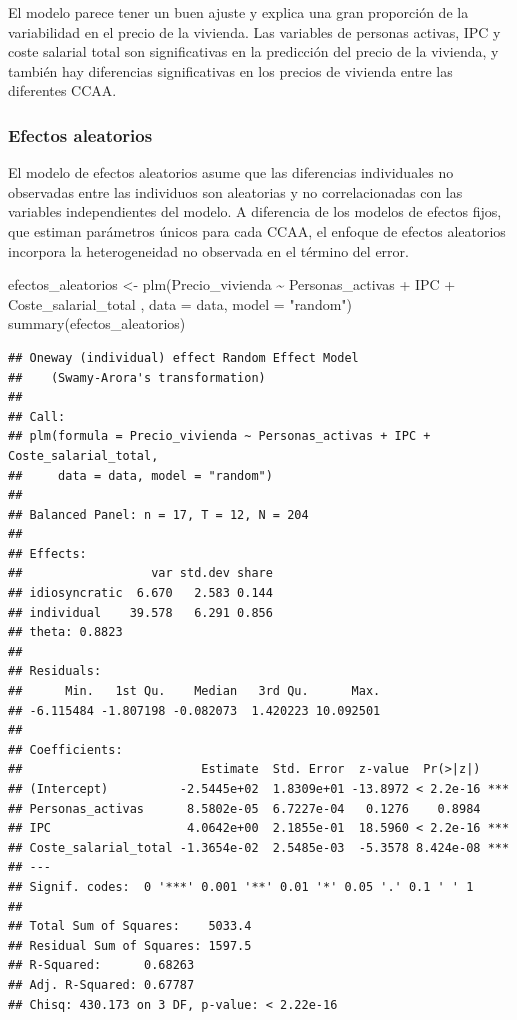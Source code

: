 \documentclass[
]{article}
\newenvironment{Shaded}{\begin{snugshade}}{\end{snugshade}}
\newcommand{\AttributeTok}[1]{\textcolor[rgb]{0.77,0.63,0.00}{#1}}
\newcommand{\FunctionTok}[1]{\textcolor[rgb]{0.00,0.00,0.00}{#1}}
\newcommand{\NormalTok}[1]{#1}
\newcommand{\OtherTok}[1]{\textcolor[rgb]{0.56,0.35,0.01}{#1}}
\newcommand{\SpecialCharTok}[1]{\textcolor[rgb]{0.00,0.00,0.00}{#1}}
\newcommand{\StringTok}[1]{\textcolor[rgb]{0.31,0.60,0.02}{#1}}
\begin{document}
El modelo parece tener un buen ajuste y explica una gran proporción de
la variabilidad en el precio de la vivienda. Las variables de personas
activas, IPC y coste salarial total son significativas en la predicción
del precio de la vivienda, y también hay diferencias significativas en
los precios de vivienda entre las diferentes CCAA.

\hypertarget{efectos-aleatorios}{%
\subsubsection{Efectos aleatorios}\label{efectos-aleatorios}}

El modelo de efectos aleatorios asume que las diferencias individuales
no observadas entre las individuos son aleatorias y no correlacionadas
con las variables independientes del modelo. A diferencia de los modelos
de efectos fijos, que estiman parámetros únicos para cada CCAA, el
enfoque de efectos aleatorios incorpora la heterogeneidad no observada
en el término del error.

\begin{Shaded}
\begin{Highlighting}[]
\NormalTok{efectos\_aleatorios }\OtherTok{\textless{}{-}} \FunctionTok{plm}\NormalTok{(Precio\_vivienda }\SpecialCharTok{\textasciitilde{}}\NormalTok{ Personas\_activas }\SpecialCharTok{+}\NormalTok{ IPC }\SpecialCharTok{+}\NormalTok{ Coste\_salarial\_total , }\AttributeTok{data =}\NormalTok{ data, }\AttributeTok{model =} \StringTok{"random"}\NormalTok{)}
\FunctionTok{summary}\NormalTok{(efectos\_aleatorios)}
\end{Highlighting}
\end{Shaded}

\begin{verbatim}
## Oneway (individual) effect Random Effect Model 
##    (Swamy-Arora's transformation)
## 
## Call:
## plm(formula = Precio_vivienda ~ Personas_activas + IPC + Coste_salarial_total, 
##     data = data, model = "random")
## 
## Balanced Panel: n = 17, T = 12, N = 204
## 
## Effects:
##                  var std.dev share
## idiosyncratic  6.670   2.583 0.144
## individual    39.578   6.291 0.856
## theta: 0.8823
## 
## Residuals:
##      Min.   1st Qu.    Median   3rd Qu.      Max. 
## -6.115484 -1.807198 -0.082073  1.420223 10.092501 
## 
## Coefficients:
##                         Estimate  Std. Error  z-value  Pr(>|z|)    
## (Intercept)          -2.5445e+02  1.8309e+01 -13.8972 < 2.2e-16 ***
## Personas_activas      8.5802e-05  6.7227e-04   0.1276    0.8984    
## IPC                   4.0642e+00  2.1855e-01  18.5960 < 2.2e-16 ***
## Coste_salarial_total -1.3654e-02  2.5485e-03  -5.3578 8.424e-08 ***
## ---
## Signif. codes:  0 '***' 0.001 '**' 0.01 '*' 0.05 '.' 0.1 ' ' 1
## 
## Total Sum of Squares:    5033.4
## Residual Sum of Squares: 1597.5
## R-Squared:      0.68263
## Adj. R-Squared: 0.67787
## Chisq: 430.173 on 3 DF, p-value: < 2.22e-16
\end{verbatim}
\end{document}
